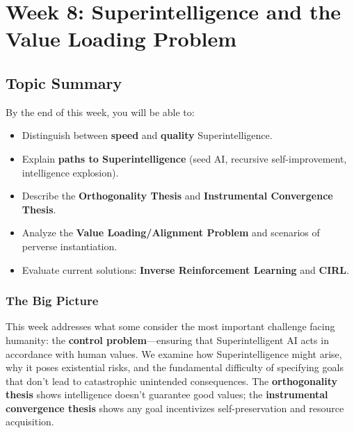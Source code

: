 \section{Week 8: Superintelligence and the Value Loading Problem}

\subsection{Topic Summary}

\begin{keybox}
By the end of this week, you will be able to:
\begin{itemize}
  \item Distinguish between \textbf{speed} and \textbf{quality} Superintelligence.
  \item Explain \textbf{paths to Superintelligence} (seed AI, recursive self-improvement, intelligence explosion).
  \item Describe the \textbf{Orthogonality Thesis} and \textbf{Instrumental Convergence Thesis}.
  \item Analyze the \textbf{Value Loading/Alignment Problem} and scenarios of perverse instantiation.
  \item Evaluate current solutions: \textbf{Inverse Reinforcement Learning} and \textbf{CIRL}.
\end{itemize}
\end{keybox}

\separator

\subsubsection*{The Big Picture}

This week addresses what some consider the most important challenge facing humanity: the \textbf{control problem}---ensuring that Superintelligent AI acts in accordance with human values. We examine how Superintelligence might arise, why it poses existential risks, and the fundamental difficulty of specifying goals that don't lead to catastrophic unintended consequences. The \textbf{orthogonality thesis} shows intelligence doesn't guarantee good values; the \textbf{instrumental convergence thesis} shows any goal incentivizes self-preservation and resource acquisition.

